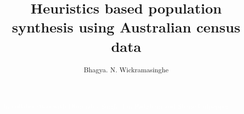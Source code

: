 \documentclass[9pt,authordate1-4]{beamer}
\title[Melbourne Synthetic Population]{Heuristics based population synthesis 
using Australian census data}
\author[Wickramasinghe et. al]{Bhagya. N. Wickramasinghe}
\institute{bhagya.wickramasinghe@rmit.edu.au\\RMIT University, Australia}
\date[2018]{}
\begin{document}
\begin{frame}[plain]
\setcounter{framenumber}{0}
\titlepage
{\large \textcolor{white}{
In collaboration with Dhirendra 
Singh, Lin Padgham and Shane Culpepper}}
\note{
}
\end{frame}

\usebackgroundtemplate{}


\end{document}

